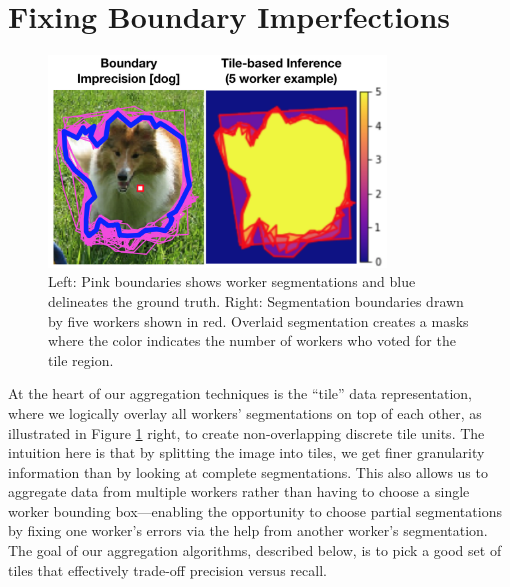 \section{Fixing Boundary Imperfections\label{sec:precision}}%
\begin{figure}[h!]
\vspace{-10pt}
\centering
\includegraphics[width=0.8\textwidth]{plots/precision_issue_tile_example.png}
\caption{Left: Pink boundaries shows worker segmentations and blue delineates the ground truth. Right: Segmentation boundaries drawn by five workers shown in red. Overlaid segmentation creates a masks where the color indicates the number of workers who voted for the tile region.}
\label{tile_demo}
\end{figure}
At the heart of our aggregation techniques is the ``tile'' data representation, where we logically overlay all workers' segmentations on top of each other, as illustrated in Figure \ref{tile_demo} right, to create non-overlapping discrete tile units. The intuition here is that by splitting the image into tiles, we get finer granularity information than by looking at complete segmentations. This also allows us to aggregate data from multiple workers rather than having to choose a single worker bounding box---enabling the opportunity to choose partial segmentations by fixing one worker's errors via the help from another worker's segmentation.
The goal of our aggregation algorithms, described below, is to pick a good set of tiles that effectively trade-off precision versus recall.

